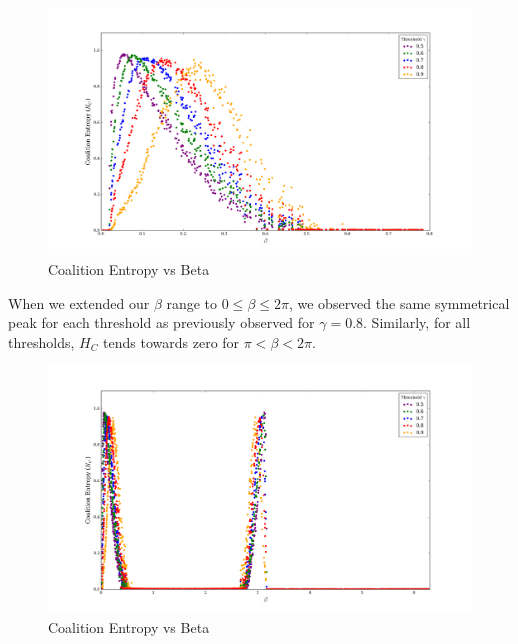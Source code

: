 \documentclass[a4paper,11pt]{article}
\begin{document}
\begin{figure}[H]
\begin{center}
\includegraphics[scale = 0.35]{figures/hc_vs_beta_orig_multi}
\caption{
	Coalition Entropy vs Beta
	\label{fig:hc-vs-beta-orig-multi}
}
\end{center}
\end{figure}

When we extended our $\beta$ range to $0 \leq \beta \leq 2\pi$, we observed the same symmetrical peak for each threshold as previously observed for $\gamma = 0.8$. Similarly, for all thresholds, $H_C$ tends towards zero for $\pi < \beta< 2\pi$.

\begin{figure}[H]
\begin{center}
\includegraphics[scale = 0.35]{figures/hc_vs_beta_ext_multi}
\caption{
	Coalition Entropy vs Beta
	\label{fig:hc-vs-beta-ext-multi}
}
\end{center}
\end{figure}

\end{document}
